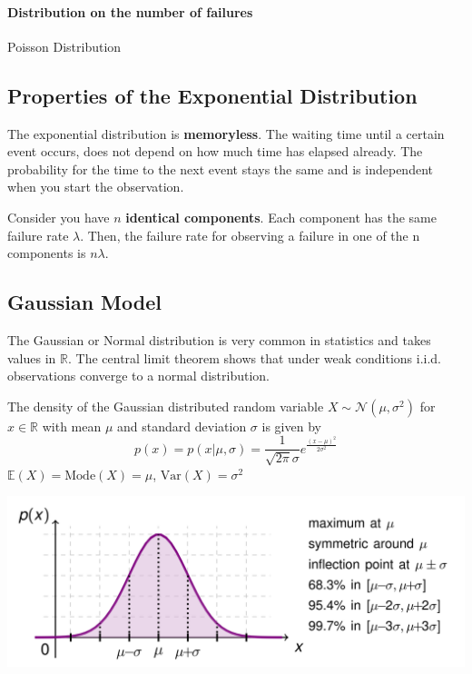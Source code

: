 \documentclass[11pt]{article}
\begin{document}
\paragraph{Distribution on the number of failures} Poisson Distribution

\subsection{Properties of the Exponential Distribution}

The exponential distribution is \textbf{memoryless}. The waiting time until a certain event occurs, does not depend on how much time has elapsed already. The probability for the time to the next event stays the same and is independent when you start the observation.

Consider you have $n$ \textbf{identical components}. Each component has the same failure rate $\lambda$. Then, the failure rate for observing a failure in one of the n components is $n\lambda$.

\subsection{Gaussian Model}

The Gaussian or Normal distribution is very common in statistics and takes values in $\mathbb{R}$. The central limit theorem shows that under weak conditions i.i.d. observations converge to a normal distribution.

The density of the Gaussian distributed random variable $X \sim \mathcal{N}(\mu,\sigma^2)$ for $x\in\mathbb{R}$ with mean $\mu$ and standard deviation $\sigma$ is given by
\begin{equation*}
	p(x) = p(x|\mu,\sigma) = \frac{1}{\sqrt{2\pi}\sigma}e^{\frac{(x-\mu)^2}{2\sigma^2}}
\end{equation*}
\noindent
$\mathbb{E}(X) = \text{Mode}(X) = \mu$, $\text{Var}(X)=\sigma^2$ 

\begin{center}
	\includegraphics[width=0.7\linewidth]{img/gaussian_distribution_density}
\end{center}
\end{document}
